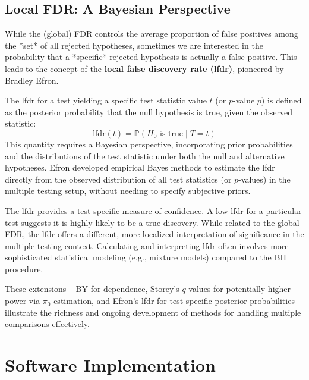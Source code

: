 \documentclass[12pt]{book}
\newcommand{\Prob}{\mathbb{P}}           %
\newcommand{\pvalue}{$p$-value}          %
\newcommand{\qvalue}{$q$-value}          %
\newcommand{\Hnull}{H_0}                 %
\begin{document}
\section{Local FDR: A Bayesian Perspective}
While the (global) FDR controls the average proportion of false positives among the *set* of all rejected hypotheses, sometimes we are interested in the probability that a *specific* rejected hypothesis is actually a false positive. This leads to the concept of the \textbf{local false discovery rate (lfdr)}, pioneered by Bradley Efron.

The lfdr for a test yielding a specific test statistic value $t$ (or \pvalue{} $p$) is defined as the posterior probability that the null hypothesis is true, given the observed statistic:
\begin{equation}
    \text{lfdr}(t) = \Prob(\Hnull \text{ is true} \mid T=t)
\end{equation}
This quantity requires a Bayesian perspective, incorporating prior probabilities and the distributions of the test statistic under both the null and alternative hypotheses. Efron developed empirical Bayes methods to estimate the lfdr directly from the observed distribution of all test statistics (or \pvalue s) in the multiple testing setup, without needing to specify subjective priors.

The lfdr provides a test-specific measure of confidence. A low lfdr for a particular test suggests it is highly likely to be a true discovery. While related to the global FDR, the lfdr offers a different, more localized interpretation of significance in the multiple testing context. Calculating and interpreting lfdr often involves more sophisticated statistical modeling (e.g., mixture models) compared to the BH procedure.

These extensions – BY for dependence, Storey's \qvalue s for potentially higher power via $\pi_0$ estimation, and Efron's lfdr for test-specific posterior probabilities – illustrate the richness and ongoing development of methods for handling multiple comparisons effectively.

\chapter{Software Implementation}
\label{chap:software}
\end{document}
